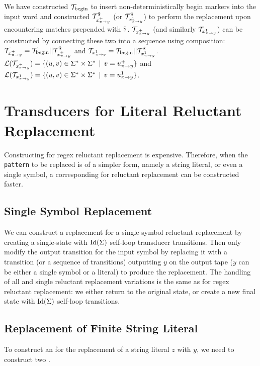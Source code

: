 We have constructed $\mathcal{T}_{\text{begin}}$ to insert non-deterministically begin markers into the input word and constructed $\mathcal{T}^\$_{x^{+}_{\pi \rightarrow y}}$ (or $\mathcal{T}^\$_{x^{1}_{\pi \rightarrow y}}$) to perform the replacement upon encountering matches prepended with $\marker$.
$\mathcal{T}_{x^{+}_{\pi \rightarrow y}}$ (and similarly $\mathcal{T}_{x^{1}_{\pi \rightarrow y}}$) can be constructed by connecting these two \nfts into a sequence using composition: $\mathcal{T}_{x^{+}_{\pi \rightarrow y}} = \mathcal{T}_{\text{begin}} || \mathcal{T}^\$_{x^{+}_{\pi \rightarrow y}}$ and $\mathcal{T}_{x^{1}_{\pi \rightarrow y}} = \mathcal{T}_{\text{begin}} || \mathcal{T}^\$_{x^{1}_{\pi \rightarrow y}}$.
$\mathcal{L}(\mathcal{T}_{x^{+}_{\pi \rightarrow y}}) = \{ (u, v) \in \Sigma^* \times \Sigma^* \,\mid\, v = u^{+}_{\pi \rightarrow y} \} $ and $\mathcal{L}(\mathcal{T}_{x^{1}_{\pi \rightarrow y}}) = \{ (u, v) \in \Sigma^* \times \Sigma^* \,\mid\, v = u^{1}_{\pi \rightarrow y} \} $.

\section{Transducers for Literal Reluctant Replacement}

Constructing \nfts for regex reluctant replacement is expensive.
Therefore, when the \texttt{pattern} to be replaced is of a simpler form, namely a string literal, or even a single symbol, a corresponding \nft for reluctant replacement can be constructed faster.

\subsection{Single Symbol Replacement}

We can construct a replacement \dft for a single symbol reluctant replacement by creating a single-state \dft with $\text{Id}(\Sigma)$ self-loop transducer transitions.
Then only modify the output transition for the input symbol by replacing it with a transition (or a sequence of transitions) outputting $y$ on the output tape ($y$ can be either a single symbol or a literal) to produce the replacement.
The handling of all and single reluctant replacement variations is the same as for regex reluctant replacement: we either return to the original state, or create a new final state with $\text{Id}(\Sigma)$ self-loop transitions.

\subsection{Replacement of Finite String Literal}

To construct an \nft for the replacement of a string literal $z$ with $y$, we need to construct two \nfts.

